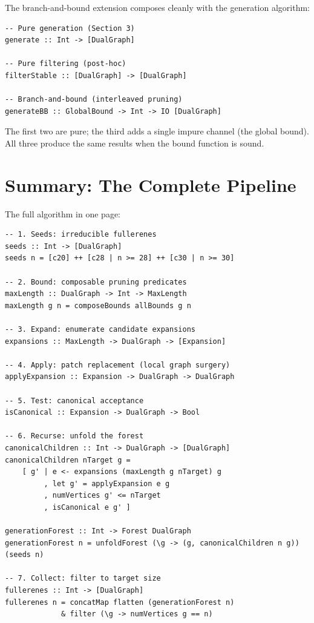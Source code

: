 \documentclass[11pt,a4paper]{article}
\theoremstyle{definition}
\begin{document}
The branch-and-bound extension composes cleanly with the generation
algorithm:

\begin{lstlisting}
-- Pure generation (Section 3)
generate :: Int -> [DualGraph]

-- Pure filtering (post-hoc)
filterStable :: [DualGraph] -> [DualGraph]

-- Branch-and-bound (interleaved pruning)
generateBB :: GlobalBound -> Int -> IO [DualGraph]
\end{lstlisting}

The first two are pure; the third adds a single impure channel (the
global bound).  All three produce the same results when the bound
function is sound.

\section{Summary: The Complete Pipeline}
\label{sec:summary}

The full algorithm in one page:

\begin{lstlisting}
-- 1. Seeds: irreducible fullerenes
seeds :: Int -> [DualGraph]
seeds n = [c20] ++ [c28 | n >= 28] ++ [c30 | n >= 30]

-- 2. Bound: composable pruning predicates
maxLength :: DualGraph -> Int -> MaxLength
maxLength g n = composeBounds allBounds g n

-- 3. Expand: enumerate candidate expansions
expansions :: MaxLength -> DualGraph -> [Expansion]

-- 4. Apply: patch replacement (local graph surgery)
applyExpansion :: Expansion -> DualGraph -> DualGraph

-- 5. Test: canonical acceptance
isCanonical :: Expansion -> DualGraph -> Bool

-- 6. Recurse: unfold the forest
canonicalChildren :: Int -> DualGraph -> [DualGraph]
canonicalChildren nTarget g =
    [ g' | e <- expansions (maxLength g nTarget) g
         , let g' = applyExpansion e g
         , numVertices g' <= nTarget
         , isCanonical e g' ]

generationForest :: Int -> Forest DualGraph
generationForest n = unfoldForest (\g -> (g, canonicalChildren n g)) (seeds n)

-- 7. Collect: filter to target size
fullerenes :: Int -> [DualGraph]
fullerenes n = concatMap flatten (generationForest n)
             & filter (\g -> numVertices g == n)
\end{lstlisting}
\end{document}
